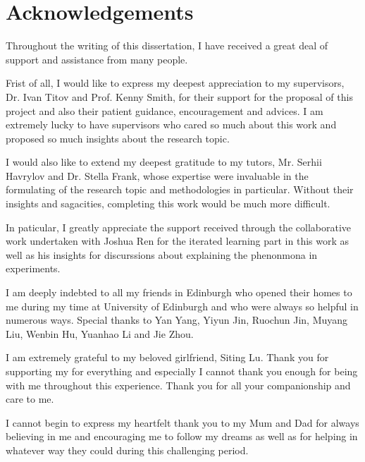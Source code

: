 \section*{Acknowledgements}
Throughout the writing of this dissertation, I have received a great deal of support and assistance from many people. 

Frist of all, I would like to express my deepest appreciation to my supervisors, Dr. Ivan Titov and Prof. Kenny Smith, for their support for the proposal of this project and also their patient guidance, encouragement and advices. I am extremely lucky to have supervisors who cared so much about this work and proposed so much insights about the research topic.

I would also like to extend my deepest gratitude to my tutors, Mr. Serhii Havrylov and Dr. Stella Frank, whose expertise were invaluable in the formulating of the research topic and methodologies in particular. Without their insights and sagacities, completing this work would be much more difficult.

In paticular, I greatly appreciate the support received through the collaborative work undertaken with Joshua Ren for the iterated learning part in this work as well as his insights for discurssions about explaining the phenonmona in experiments.

I am deeply indebted to all my friends in Edinburgh who opened their homes to me during my time at University of Edinburgh and who were always so helpful in numerous ways. Special thanks to Yan Yang, Yiyun Jin, Ruochun Jin, Muyang Liu, Wenbin Hu, Yuanhao Li and Jie Zhou.

I am extremely grateful to my beloved girlfriend, Siting Lu. Thank you for supporting my for everything and especially I cannot thank you enough for being with me throughout this experience. Thank you for all your companionship and care to me.

I cannot begin to express my heartfelt thank you to my Mum and Dad for always believing in me and encouraging me to follow my dreams as well as for helping in whatever way they could during this challenging period.